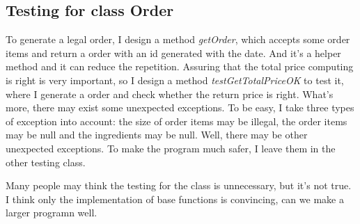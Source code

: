 \documentclass[a4paper]{report}
\begin{document}
\subsection {Testing for class Order}
\par To generate a legal order, I design a method \emph{getOrder}, which accepts some order items and return a order with an id generated with the date. And it's a helper method and it can reduce the repetition. Assuring that the total price computing is right is very important, so I design a method \emph{testGetTotalPriceOK} to test it, where I generate a order and check whether the return price is right. What's more, there may exist some unexpected exceptions. To be easy, I take three types of exception into account: the size of order items may be illegal, the order items may be null and the ingredients may be null. Well, there may be other unexpected exceptions. To make the  program much safer, I leave them in the other testing class. 
\par Many people may think the testing for the class is unnecessary, but it's not true. I think only the implementation of base functions is convincing, can we make a larger programn well.
\end{document}
